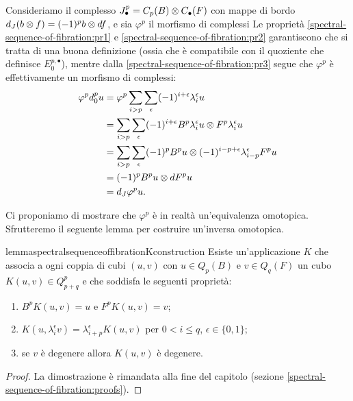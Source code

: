 Consideriamo il complesso \(J^p_\bullet=C_p(B)\mathbin{\otimes} C_\bullet(F)\) con mappe di bordo \(d_J(b\mathbin{\otimes} f)=(-1)^pb\mathbin{\otimes} df\), e sia \(\varphi^p\) il morfismo di complessi
Le proprietà \ref{spectral-sequence-of-fibration:pr1} e \ref{spectral-sequence-of-fibration:pr2} garantiscono che si tratta di una buona definizione (ossia che è compatibile con il quoziente che definisce \(E^{p,\bullet}_0\)), mentre dalla \ref{spectral-sequence-of-fibration:pr3} segue che \(\varphi^p\) è effettivamente un morfismo di complessi:
\begin{align*}
\varphi^pd^p_0u&=\varphi^p\sum_{i>p}\sum_\epsilon(-1)^{i+\epsilon}\lambda^\epsilon_iu\\
&=\sum_{i>p}\sum_\epsilon(-1)^{i+\epsilon}B^p\lambda^\epsilon_iu\mathbin{\otimes} F^p\lambda^\epsilon_iu\\
&=\sum_{i>p}\sum_\epsilon(-1)^pB^pu\mathbin{\otimes}(-1)^{i-p+\epsilon}\lambda^\epsilon_{i-p}F^pu\\
&=(-1)^pB^pu\mathbin{\otimes} dF^pu\\
&=d_J\varphi^pu.
\end{align*}

Ci proponiamo di mostrare che \(\varphi^p\) è in realtà un'equivalenza omotopica. Sfrutteremo il seguente lemma per costruire un'inversa omotopica.

\begin{restatable}{lemma}{spectralsequenceoffibrationKconstruction}\label{spectral-sequence-of-fibration-K-construction}
Esiste un'applicazione \(K\) che associa a ogni coppia di cubi \((u,v)\) con \(u\in Q_p(B)\) e \(v\in Q_q(F)\) un cubo \(K(u,v)\in Q^p_{p+q}\) e che soddisfa le seguenti proprietà:
\begin{enumerate}
\item\label{spectral-sequence-of-fibration-K-construction:pr1} \(B^pK(u,v)=u\) e \(F^pK(u,v)=v\);
\item\label{spectral-sequence-of-fibration-K-construction:pr2}  \(K(u,\lambda^\epsilon_iv)=\lambda^\epsilon_{i+p}K(u,v)\) per \(0<i\le q\), \(\epsilon\in\{0,1\}\);
\item\label{spectral-sequence-of-fibration-K-construction:pr3} se \(v\) è degenere allora \(K(u,v)\) è degenere.
\end{enumerate}
\end{restatable}
\begin{proof}
La dimostrazione è rimandata alla fine del capitolo (sezione \ref{spectral-sequence-of-fibration:proofs}).
\end{proof}

